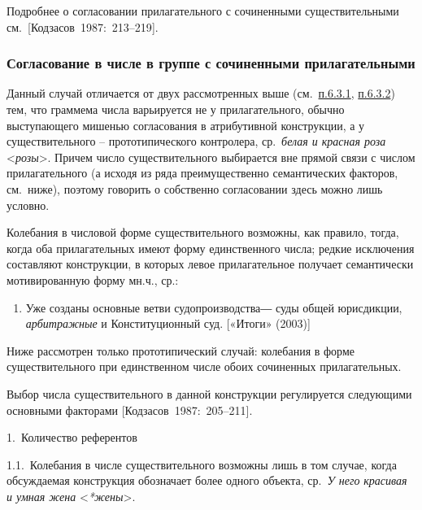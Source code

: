 Подробнее о согласовании прилагательного с сочиненными существительными
см.~{[}Кодзасов~1987:~213--219{]}.

\subsubsection{Согласование в числе в группе с сочиненными
прилагательными}\label{ux441ux43eux433ux43bux430ux441ux43eux432ux430ux43dux438ux435-ux432-ux447ux438ux441ux43bux435-ux432-ux433ux440ux443ux43fux43fux435-ux441-ux441ux43eux447ux438ux43dux435ux43dux43dux44bux43cux438-ux43fux440ux438ux43bux430ux433ux430ux442ux435ux43bux44cux43dux44bux43cux438}

Данный случай отличается от двух рассмотренных выше
(см.~\underline{п.6.3.1}, \underline{п.6.3.2}) тем, что граммема числа
варьируется не у прилагательного, обычно выступающего мишенью
согласования в атрибутивной конструкции, а у существительного --
прототипического контролера, ср.~\textit{белая и красная роза}
\textless{}\textit{розы}\textgreater. Причем число существительного
выбирается вне прямой связи с числом прилагательного (а исходя из ряда
преимущественно семантических факторов, см.~ниже), поэтому говорить о
собственно согласовании здесь можно лишь условно.

Колебания в числовой форме существительного возможны, как правило,
тогда, когда оба прилагательных имеют форму единственного числа; редкие
исключения составляют конструкции, в которых левое прилагательное
получает семантически мотивированную форму мн.ч., ср.:

\begin{enumerate}
\def\labelenumi{(\arabic{enumi})}
\setcounter{enumi}{142}
\item
  Уже созданы основные ветви судопроизводства― суды общей юрисдикции,
  \textit{арбитражные} и Конституционный суд. {[}«Итоги» (2003){]}
\end{enumerate}

Ниже рассмотрен только прототипический случай: колебания в форме
существительного при единственном числе обоих сочиненных прилагательных.

Выбор числа существительного в данной конструкции регулируется
следующими основными факторами {[}Кодзасов~1987:~205--211{]}.

1.~Количество референтов

1.1.~Колебания в числе существительного возможны лишь в том случае,
когда обсуждаемая конструкция обозначает более одного объекта,
ср.~\textit{У него} \textit{красивая и умная жена}
\textless{}\textit{*жены}\textgreater.

